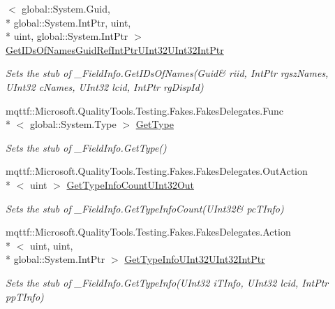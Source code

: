 \begin{DoxyCompactItemize}
$<$ global\-::\-System.\-Guid, \\*
global\-::\-System.\-Int\-Ptr, uint, \\*
uint, global\-::\-System.\-Int\-Ptr $>$ \hyperlink{class_system_1_1_runtime_1_1_interop_services_1_1_fakes_1_1_stub___field_info_a3d99b5a3ebeec78b458bbb670aa8ae9a}{Get\-I\-Ds\-Of\-Names\-Guid\-Ref\-Int\-Ptr\-U\-Int32\-U\-Int32\-Int\-Ptr}
\begin{DoxyCompactList}\small\item\em Sets the stub of \-\_\-\-Field\-Info.\-Get\-I\-Ds\-Of\-Names(Guid\& riid, Int\-Ptr rgsz\-Names, U\-Int32 c\-Names, U\-Int32 lcid, Int\-Ptr rg\-Disp\-Id)\end{DoxyCompactList}\item 
mqttf\-::\-Microsoft.\-Quality\-Tools.\-Testing.\-Fakes.\-Fakes\-Delegates.\-Func\\*
$<$ global\-::\-System.\-Type $>$ \hyperlink{class_system_1_1_runtime_1_1_interop_services_1_1_fakes_1_1_stub___field_info_ae24d0020b0312495ead79c2c8e266a6d}{Get\-Type}
\begin{DoxyCompactList}\small\item\em Sets the stub of \-\_\-\-Field\-Info.\-Get\-Type()\end{DoxyCompactList}\item 
mqttf\-::\-Microsoft.\-Quality\-Tools.\-Testing.\-Fakes.\-Fakes\-Delegates.\-Out\-Action\\*
$<$ uint $>$ \hyperlink{class_system_1_1_runtime_1_1_interop_services_1_1_fakes_1_1_stub___field_info_a403fba1897341f1395e7f2c5dcda2dab}{Get\-Type\-Info\-Count\-U\-Int32\-Out}
\begin{DoxyCompactList}\small\item\em Sets the stub of \-\_\-\-Field\-Info.\-Get\-Type\-Info\-Count(U\-Int32\& pc\-T\-Info)\end{DoxyCompactList}\item 
mqttf\-::\-Microsoft.\-Quality\-Tools.\-Testing.\-Fakes.\-Fakes\-Delegates.\-Action\\*
$<$ uint, uint, \\*
global\-::\-System.\-Int\-Ptr $>$ \hyperlink{class_system_1_1_runtime_1_1_interop_services_1_1_fakes_1_1_stub___field_info_ae20e271b9f74a07346af544b0b171345}{Get\-Type\-Info\-U\-Int32\-U\-Int32\-Int\-Ptr}
\begin{DoxyCompactList}\small\item\em Sets the stub of \-\_\-\-Field\-Info.\-Get\-Type\-Info(\-U\-Int32 i\-T\-Info, U\-Int32 lcid, Int\-Ptr pp\-T\-Info)\end{DoxyCompactList}\item 

\end{DoxyCompactItemize}
